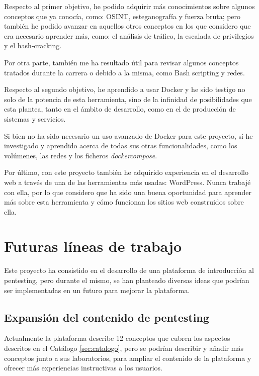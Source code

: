         Respecto al primer objetivo, he podido adquirir más conocimientos sobre algunos conceptos que ya conocía, como: OSINT, esteganografía y fuerza bruta; pero también he podido avanzar en aquellos otros conceptos en los que considero que era necesario aprender más, como: el análisis de tráfico, la escalada de privilegios y el hash-cracking.
        
        Por otra parte, también me ha resultado útil para revisar algunos conceptos tratados durante la carrera o debido a la misma, como Bash scripting y redes.

        Respecto al segundo objetivo, he aprendido a usar Docker y he sido testigo no solo de la potencia de esta herramienta, sino de la infinidad de posibilidades que esta plantea, tanto en el ámbito de desarrollo, como en el de producción de sistemas y servicios.

        Si bien no ha sido necesario un uso avanzado de Docker para este proyecto, sí he investigado y aprendido acerca de todas sus otras funcionalidades, como los volúmenes, las redes y los ficheros \textit{dockercompose}.

        Por último, con este proyecto también he adquirido experiencia en el desarrollo web a través de una de las herramientas más usadas: WordPress. Nunca trabajé con ella, por lo que considero que ha sido una buena oportunidad para aprender más sobre esta herramienta y cómo funcionan los sitios web construidos sobre ella.

    
    \section{Futuras líneas de trabajo}
        \label{sec:futuras-lineas-trabajo}

        Este proyecto ha consistido en el desarrollo de una plataforma de introducción al pentesting, pero durante el mismo, se han planteado diversas ideas que podrían ser implementadas en un futuro para mejorar la plataforma.

        \subsection{Expansión del contenido de pentesting}

            Actualmente la plataforma describe 12 conceptos que cubren los aspectos descritos en el Catálogo \ref{sec:catalogo}, pero se podrían describir y añadir más conceptos junto a sus laboratorios, para ampliar el contenido de la plataforma y ofrecer más experiencias instructivas a los usuarios.

